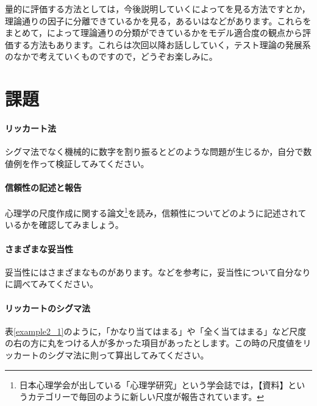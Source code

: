 \documentclass{ltjsbook}
\begin{document}
量的に評価する方法としては，今後説明していくによってを見る方法ですとか，理論通りの因子に分離できているかを見る，あるいはなどがあります。これらをまとめて，によって理論通りの分類ができているかをモデル適合度の観点から評価する方法もあります。これらは次回以降お話ししていく，テスト理論の発展系のなかで考えていくものですので，どうぞお楽しみに。

\section{課題}
\paragraph{リッカート法}シグマ法でなく機械的に数字を割り振るとどのような問題が生じるか，自分で数値例を作って検証してみてください。
\paragraph{信頼性の記述と報告}心理学の尺度作成に関する論文\footnote{日本心理学会が出している「心理学研究」という学会誌では，【資料】というカテゴリーで毎回のように新しい尺度が報告されています。}を読み，信頼性についてどのように記述されているかを確認してみましょう。
\paragraph{さまざまな妥当性}妥当性にはさまざまなものがあります。\citet{kosugi2016b}などを参考に，妥当性について自分なりに調べてみてください。
\paragraph{リッカートのシグマ法} 表\ref{example2_1}のように，「かなり当てはまる」や「全く当てはまる」など尺度の右の方に丸をつける人が多かった項目があったとします。この時の尺度値をリッカートのシグマ法に則って算出してみてください。
\end{document}
